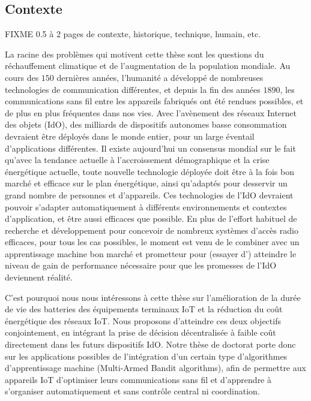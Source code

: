 \begin{resume_fr}
\section*{Contexte}

FIXME 0.5 à 2 pages de contexte, historique, technique, humain, etc.

%
La racine des problèmes qui motivent cette thèse sont les questions du réchauffement climatique et de l'augmentation de la population mondiale.
Au cours des $150$ dernières années, l'humanité a développé de nombreuses technologies de communication différentes, et depuis la fin des années $1890$, les communications sans fil entre les appareils fabriqués ont été rendues possibles, et de plus en plus fréquentes dans nos vies.
Avec l'avènement des réseaux Internet des objets (IdO), des milliards de dispositifs autonomes basse consommation devraient être déployés dans le monde entier, pour un large éventail d'applications différentes.
Il existe aujourd'hui un consensus mondial sur le fait qu'avec la tendance actuelle à l'accroissement démographique et la crise énergétique actuelle, toute nouvelle technologie déployée doit être à la fois bon marché et efficace sur le plan énergétique,
ainsi qu'adaptés pour desservir un grand nombre de personnes et d'appareils.
%
Ces technologies de l'IdO devraient pouvoir s'adapter automatiquement à différents environnements et contextes d'application, et être aussi efficaces que possible.
%
En plus de l'effort habituel de recherche et développement pour concevoir de nombreux systèmes d'accès radio efficaces, pour tous les cas possibles,
le moment est venu de le combiner avec un apprentissage machine bon marché et prometteur pour (essayer d') atteindre le niveau de gain de performance nécessaire pour que les promesses de l'IdO deviennent réalité.


C'est pourquoi nous nous intéressons à cette thèse sur
l'amélioration de la durée de vie des batteries des équipements terminaux IoT et la réduction du coût énergétique des réseaux IoT.
Nous proposons d'atteindre ces deux objectifs conjointement, en intégrant la prise de décision décentralisée à faible coût directement dans les futurs dispositifs IdO.
%
Notre thèse de doctorat porte donc sur les applications possibles de l'intégration d'un certain type d'algorithmes d'apprentissage machine (Multi-Armed Bandit algorithms), afin de permettre aux appareils IoT d'optimiser leurs communications sans fil et d'apprendre à s'organiser automatiquement et sans contrôle central ni coordination.



\end{resume_fr}
